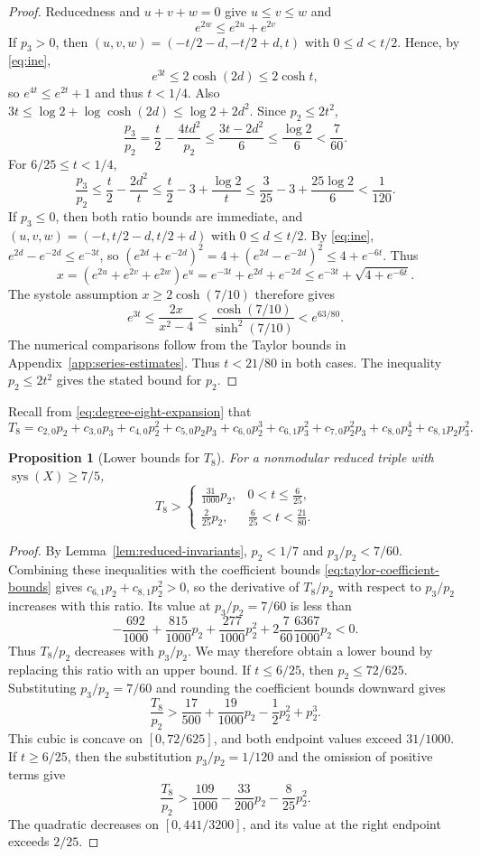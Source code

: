 \documentclass[10pt,twoside]{article}
\theoremstyle{plain}
\newtheorem{proposition}[theorem]{Proposition}
\theoremstyle{definition}
\theoremstyle{remark}
\DeclareMathOperator{\sys}{sys}
\begin{document}
\begin{proof}
Reducedness and $u+v+w=0$ give $u\leq v\leq w$ and
\begin{equation}\label{eq:ine}
    e^{2w}\leq e^{2u}+e^{2v}
\end{equation} 
If $p_3>0$, then
$(u,v,w)=(-t/2-d,-t/2+d,t)$ with $0\leq d<t/2$.
Hence, by \eqref{eq:ine},
$$
e^{3t}\leq2\cosh(2d)\leq2\cosh t,
$$
so $e^{4t}\leq e^{2t}+1$ and thus $t<1/4$.
Also
$
3t\leq\log2+\log\cosh(2d)\leq\log2+2d^2.
$
Since $p_2\leq2t^2$,
$$
\frac{p_3}{p_2}
=\frac{t}{2}-\frac{4td^2}{p_2}
\leq \frac{3t-2d^2}{6}
\le \frac{\log2}{6}<\frac7{60}.
$$
For $6/25\leq t<1/4$,
$$
\frac{p_3}{p_2}\le \frac{t}{2}-\frac{2d^2}{t}
\leq\frac t2-3+\frac{\log2}{t}
\leq\frac3{25}-3+\frac{25\log2}{6}
<\frac1{120}.
$$
If $p_3\leq0$, then both ratio bounds are immediate, and
$(u,v,w)=(-t,t/2-d,t/2+d)$ with $0\leq d\leq t/2$.
By \eqref{eq:ine}, $e^{2d}-e^{-2d}\leq e^{-3t}$, so $(e^{2d}+e^{-2d})^2
=4+(e^{2d}-e^{-2d})^2
\le 4+e^{-6t}$. Thus
$$
x=(e^{2u}+e^{2v}+e^{2w})e^u=e^{-3t}+e^{2d}+e^{-2d}
\leq e^{-3t}+\sqrt{4+e^{-6t}}.
$$
The systole assumption $x\geq2\cosh(7/10)$ therefore gives
$$
e^{3t}\leq\frac{2x}{x^2-4}
\leq\frac{\cosh(7/10)}{\sinh^2(7/10)}
<e^{63/80}.
$$
The numerical comparisons follow from the Taylor bounds in
Appendix~\ref{app:series-estimates}.
Thus $t<21/80$ in both cases. The inequality $p_2\leq2t^2$
gives the stated bound for $p_2$.
\end{proof}
Recall from \eqref{eq:degree-eight-expansion} that $$T_8 =c_{2,0}p_2+c_{3,0}p_3+c_{4,0}p_2^2+c_{5,0}p_2p_3
+c_{6,0}p_2^3+c_{6,1}p_3^2+c_{7,0}p_2^2p_3+c_{8,0}p_2^4+c_{8,1}p_2p_3^2.$$
\begin{proposition}[Lower bounds for $T_8$]
\label{prop:global-polynomial}
For a nonmodular reduced triple with $\sys(X)\geq7/5$,
$$
T_8>
\begin{cases}
\frac{31}{1000}p_2,&0<t\leq\frac6{25},\\
\frac2{25}p_2,&\frac6{25}<t<\frac{21}{80}.
\end{cases}
$$
\end{proposition}

\begin{proof}
By Lemma~\ref{lem:reduced-invariants}, $p_2<1/7$ and
$p_3/p_2<7/60$. Combining these inequalities with the coefficient bounds
\eqref{eq:taylor-coefficient-bounds} gives
$c_{6,1}p_2+c_{8,1}p_2^2>0$, so the derivative of $T_8/p_2$
with respect to $p_3/p_2$ increases with this ratio.
Its value at $p_3/p_2=7/60$ is less than
$$
-\frac{692}{1000}+\frac{815}{1000}p_2
+\frac{277}{1000}p_2^2+2\frac7{60}\frac{6367}{1000}p_2<0.
$$
Thus $T_8/p_2$ decreases with $p_3/p_2$. We may therefore obtain
a lower bound by replacing this ratio with an upper bound.
If $t\leq6/25$, then $p_2\leq72/625$.
Substituting $p_3/p_2=7/60$ and rounding the coefficient
bounds downward gives
$$
\frac{T_8}{p_2}>
\frac{17}{500}+\frac{19}{1000}p_2-\frac12p_2^2+p_2^3.
$$
This cubic is concave on $[0,72/625]$, and both endpoint
values exceed $31/1000$.
If $t\geq6/25$, then the substitution $p_3/p_2=1/120$ and
the omission of positive terms give
$$
\frac{T_8}{p_2}>
\frac{109}{1000}-\frac{33}{200}p_2-\frac8{25}p_2^2.
$$
The quadratic decreases on $[0,441/3200]$, and its value
at the right endpoint exceeds $2/25$.
\end{proof}
\end{document}
